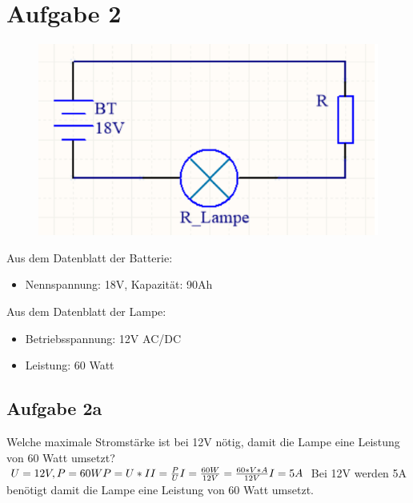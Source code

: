 \section{Aufgabe 2}
	\begin{figure}[h]
		\centering
		\includegraphics[width=0.5\linewidth]{images/Stromkreis_Lampe}
		\caption{}
		\label{fig:Stromkreis_Lampe}
	\end{figure}
	Aus dem Datenblatt der Batterie:\\
	\begin{itemize}
		\item Nennspannung: 18V, Kapazität: 90Ah\\
	\end{itemize}
	Aus dem Datenblatt der Lampe:\\
	\begin{itemize}
		\item Betriebsspannung: 12V AC/DC\\
		\item Leistung: 60 Watt\\
	\end{itemize}
	\subsection{Aufgabe 2a}
		Welche maximale Stromstärke ist bei 12V nötig, damit die Lampe eine Leistung von 60 Watt umsetzt?\\
		$
		U = 12V, P = 60W\\
		P = U * I\\
		I = \frac{P}{U}\\
		I = \frac{60W}{12V} = \frac{60 * V * A}{12V}\\
		I = 5A\\
		$
		Bei 12V werden 5A benötigt damit die Lampe eine Leistung von 60 Watt umsetzt.\\

